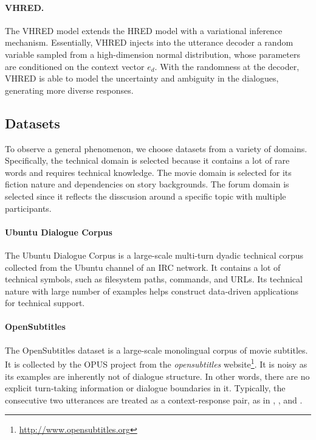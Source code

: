 \documentclass[runningheads]{llncs}
\begin{document}
    \paragraph{VHRED.}
    The VHRED model \cite{VHRED} extends the HRED model with a variational inference mechanism. Essentially, VHRED injects into the utterance decoder a random variable sampled from a high-dimension normal distribution, whose parameters are conditioned on the context vector $e_d$. With the randomness at the decoder, VHRED is able to model the uncertainty and ambiguity in the dialogues, generating more diverse responses.

    \subsection{Datasets}
    To observe a general phenomenon, we choose datasets from a variety of domains. Specifically, the technical domain is selected because it contains a lot of rare words and requires technical knowledge. The movie domain is selected for its fiction nature and dependencies on story backgrounds. The forum domain is selected since it reflects the disscusion around a specific topic with multiple participants.

    \paragraph{Ubuntu Dialogue Corpus}
    The Ubuntu Dialogue Corpus \cite{ubuntu_corpus} is a large-scale multi-turn dyadic technical corpus collected from the Ubuntu channel of an IRC network. It contains a lot of technical symbols, such as filesystem paths, commands, and URLs. Its technical nature with large number of examples helps construct data-driven applications for technical support.

    \paragraph{OpenSubtitles}
    The OpenSubtitles dataset \cite{opensub} is a large-scale monolingual corpus of movie subtitles. It is collected by the OPUS project \cite{OPUS} from the \emph{opensubtitles} website\footnote{\url{http://www.opensubtitles.org}}. It is noisy as its examples are inherently not of dialogue structure. In other words, there are no explicit turn-taking information or dialogue boundaries in it. Typically, the consecutive two utterances are treated as a context-response pair, as in \cite{GoogleChatbot}, \cite{MMI}, and \cite{persona}.
\end{document}
